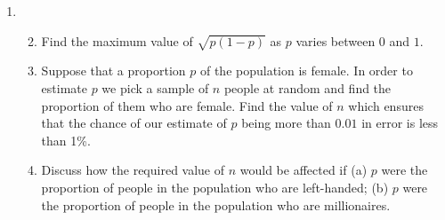 \documentclass[a4, 11pt]{report}
\newlength{\qspace}
\newcounter{qnumber}
\newenvironment{question}%
 {\vspace{\qspace}
  \begin{enumerate}[\bfseries 1\quad][10]%
    \setcounter{enumi}{\value{qnumber}}%
    \item%
 }
{
  \end{enumerate}
  \filbreak
  \stepcounter{qnumber}
 }
\newenvironment{questionparts}[1][1]%
 {
  \begin{enumerate}[\bfseries (i)]%
    \setcounter{enumii}{#1}
    \addtocounter{enumii}{-1}
    \setlength{\itemsep}{5mm}
    \setlength{\parskip}{8pt}
 }
 {
  \end{enumerate}
 }
\begin{document}
\begin{question}
\begin{questionparts}
\item Find the maximum value of $\sqrt{p(1-p)}$
as $p$ varies between $0$ and $1$. 
\item Suppose that a proportion $p$ of the population is female.
In order to estimate $p$ we pick a sample of $n$ people at random
and find the proportion of them who are female. Find the value of
$n$ which ensures that the chance of our estimate of $p$ being more
than $0.01$ in error is less than 1\%. 
\item Discuss how the required value of $n$ would be affected if
(a) $p$ were the proportion of people in the population who are left-handed;
(b) $p$ were the proportion of people in the population who are millionaires. 
\end{questionparts}
\end{question}
	
\end{document}
